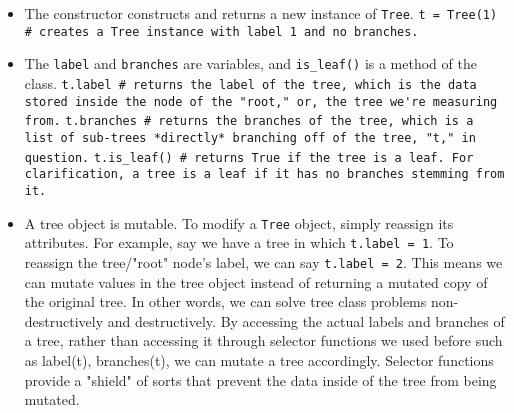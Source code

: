 \vspace{2mm}
\begin{itemize}
\item The constructor constructs and returns a new instance of \lstinline{Tree}.
    \subitem \lstinline{t = Tree(1) # creates a Tree instance with label 1 and no branches.}
\item The \lstinline{label} and \lstinline{branches} are variables, and \lstinline{is_leaf()} is a method of the class.
    \subitem \lstinline{t.label # returns the label of the tree, which is the data stored inside the node of the "root," or, the tree we're measuring from.}
    \subitem \lstinline{t.branches # returns the branches of the tree, which is a list of sub-trees *directly* branching off of the tree, "t," in question.}
    \subitem \lstinline{t.is_leaf() # returns True if the tree is a leaf. For clarification, a tree is a leaf if it has no branches stemming from it.}
\item A tree object is mutable.
    \subitem To modify a \lstinline{Tree} object, simply reassign its attributes. For example, say we have a tree in which \lstinline{t.label = 1}. To reassign the tree/"root" node's label, we can say \lstinline{t.label = 2}.
    \subitem This means we can mutate values in the tree object instead of returning a mutated copy of the original tree. In other words, we can solve tree class problems non-destructively and destructively.
    \subitem By accessing the actual labels and branches of a tree, rather than accessing it through selector functions we used before such as label(t), branches(t), we can mutate a tree accordingly. Selector functions provide a "shield" of sorts that prevent the data inside of the tree from being mutated.
\end{itemize}